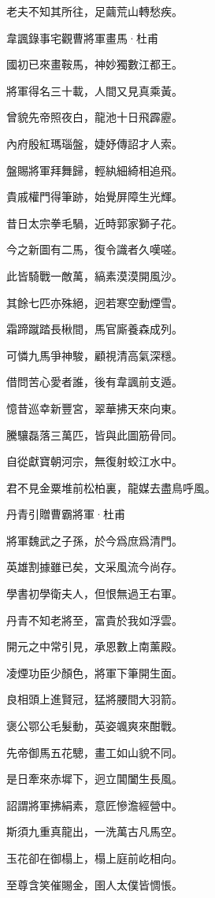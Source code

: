 \documentclass[12pt,a4paper]{ctexbook}
\begin{document}
老夫不知其所往，足繭荒山轉愁疾。\par
韋諷錄事宅觀曹將軍畫馬·杜甫\par
國初已來畫鞍馬，神妙獨數江都王。\par
將軍得名三十載，人間又見真乘黃。\par
曾貌先帝照夜白，龍池十日飛霹靂。\par
內府殷紅瑪瑙盤，婕妤傳詔才人索。\par
盤賜將軍拜舞歸，輕紈細綺相追飛。\par
貴戚權門得筆跡，始覺屏障生光輝。\par
昔日太宗拳毛騧，近時郭家獅子花。\par
今之新圖有二馬，復令識者久嘆嗟。\par
此皆騎戰一敵萬，縞素漠漠開風沙。\par
其餘七匹亦殊絕，迥若寒空動煙雪。\par
霜蹄蹴踏長楸間，馬官廝養森成列。\par
可憐九馬爭神駿，顧視清高氣深穩。\par
借問苦心愛者誰，後有韋諷前支遁。\par
憶昔巡幸新豐宮，翠華拂天來向東。\par
騰驤磊落三萬匹，皆與此圖筋骨同。\par
自從獻寶朝河宗，無復射蛟江水中。\par
君不見金粟堆前松柏裏，龍媒去盡鳥呼風。\par
丹青引贈曹霸將軍·杜甫\par
將軍魏武之子孫，於今爲庶爲清門。\par
英雄割據雖已矣，文采風流今尚存。\par
學書初學衛夫人，但恨無過王右軍。\par
丹青不知老將至，富貴於我如浮雲。\par
開元之中常引見，承恩數上南薰殿。\par
凌煙功臣少顏色，將軍下筆開生面。\par
良相頭上進賢冠，猛將腰間大羽箭。\par
褒公鄂公毛髮動，英姿颯爽來酣戰。\par
先帝御馬五花驄，畫工如山貌不同。\par
是日牽來赤墀下，迥立閶闔生長風。\par
詔謂將軍拂絹素，意匠慘澹經營中。\par
斯須九重真龍出，一洗萬古凡馬空。\par
玉花卻在御榻上，榻上庭前屹相向。\par
至尊含笑催賜金，圉人太僕皆惆悵。\par
\end{document}
